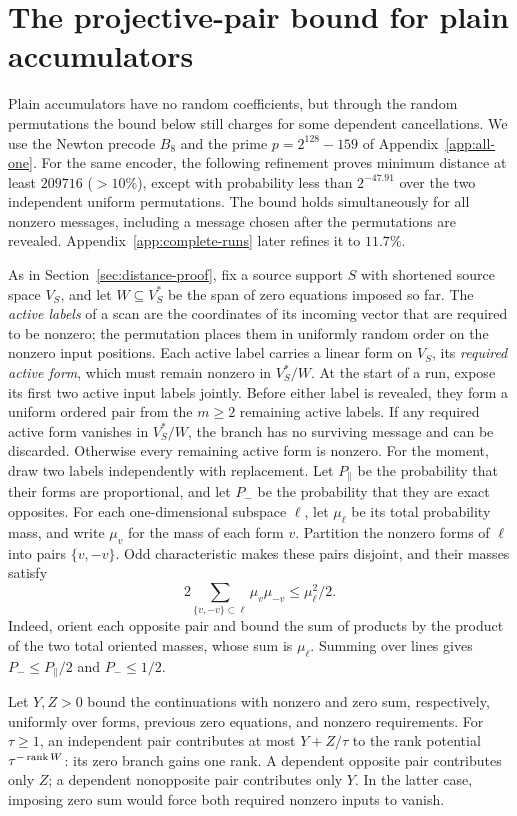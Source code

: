 \section{The projective-pair bound for plain accumulators}\label{app:fresh-pairs}

Plain accumulators have no random coefficients, but through the random
permutations the bound below still charges for some dependent
cancellations. We use the Newton precode $B_8$ and the
prime $p=2^{128}-159$ of Appendix~\ref{app:all-one}. For the same
encoder, the following refinement proves minimum distance at least
$209716$ ($>10\%$), except with probability less than $2^{-47.91}$ over
the two independent uniform permutations. The bound holds simultaneously
for all nonzero messages, including a message chosen after the
permutations are revealed. Appendix~\ref{app:complete-runs} later
refines it to $11.7\%$.

As in Section~\ref{sec:distance-proof}, fix a source support $S$ with
shortened source space $V_S$, and let $W\subseteq V_S^*$ be the span
of zero equations imposed so far. The \emph{active labels} of a scan
are the coordinates of its incoming vector that are required to be
nonzero; the permutation places them in uniformly random order on the
nonzero input positions. Each active label carries a
linear form on $V_S$, its \emph{required active form}, which must
remain nonzero in $V_S^*/W$. At the start of a run, expose its first two
active input labels jointly. Before either label is revealed, they form
a uniform ordered pair from the $m\ge2$ remaining active labels.
If any required active form vanishes in $V_S^*/W$, the branch has no
surviving message and can be discarded. Otherwise every remaining active
form is nonzero. For the moment, draw two labels independently with
replacement. Let $P_\parallel$ be the probability that their forms are proportional,
and let $P_-$ be the probability that they are exact opposites. For each
one-dimensional subspace $\ell$, let $\mu_\ell$ be its total probability
mass, and write $\mu_v$ for the mass of each form $v$. Partition
the nonzero forms of $\ell$ into pairs $\{v,-v\}$. Odd characteristic
makes these pairs disjoint, and their masses satisfy
\[
 2\sum_{\{v,-v\}\subset\ell}\mu_v\mu_{-v}\le \mu_\ell^2/2.
\]
Indeed, orient each opposite pair and bound the sum of products by the
product of the two total oriented masses, whose sum is $\mu_\ell$.
Summing over lines gives $P_-\le P_\parallel/2$ and $P_-\le1/2$.

Let $Y,Z>0$ bound the continuations with nonzero and zero sum,
respectively, uniformly over forms, previous zero equations, and
nonzero requirements. For $\tau\ge1$, an independent pair contributes
at most $Y+Z/\tau$ to the rank potential $\tau^{-\operatorname{rank} W}$: its zero
branch gains one rank. A dependent opposite pair contributes only $Z$;
a dependent nonopposite pair contributes only $Y$. In the latter case,
imposing zero sum would force both required nonzero inputs to vanish.

